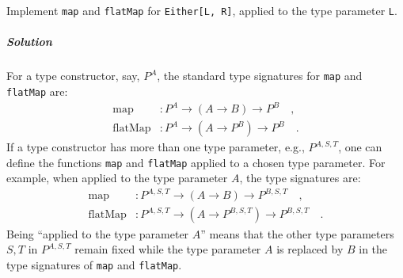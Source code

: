 Implement \lstinline!map! and \lstinline!flatMap! for \lstinline!Either[L, R]!,
applied to the type parameter \lstinline!L!.

\subparagraph{Solution}

For a type constructor, say, $P^{A}$, the standard type signatures
for \lstinline!map! and \lstinline!flatMap! are:
\begin{align*}
\text{map} & :P^{A}\rightarrow(A\rightarrow B)\rightarrow P^{B}\quad,\\
\text{flatMap} & :P^{A}\rightarrow(A\rightarrow P^{B})\rightarrow P^{B}\quad.
\end{align*}
If a type constructor has more than one type parameter, e.g., $P^{A,S,T}$,
one can define the functions \lstinline!map! and \lstinline!flatMap!
applied to a chosen type parameter. For example, when applied to the
type parameter $A$, the type signatures are:
\begin{align*}
\text{map} & :P^{A,S,T}\rightarrow(A\rightarrow B)\rightarrow P^{B,S,T}\quad,\\
\text{flatMap} & :P^{A,S,T}\rightarrow(A\rightarrow P^{B,S,T})\rightarrow P^{B,S,T}\quad.
\end{align*}
Being \textsf{``}applied to the type parameter $A$\textsf{''} means that the other
type parameters $S,T$ in $P^{A,S,T}$ remain fixed while the type
parameter $A$ is replaced by $B$ in the type signatures of \lstinline!map!
and \lstinline!flatMap!.


